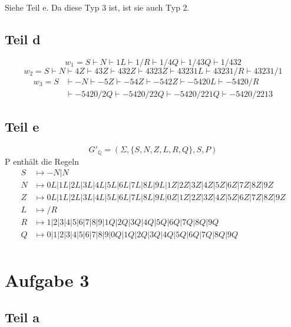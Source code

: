 \documentclass[10pt,a4paper]{article}
\begin{document}
Siehe Teil e.
Da diese Typ 3 ist, ist sie auch Typ 2.

\subsection{Teil d}

\begin{equation}
  w_{1} = S \vdash N \vdash 1L \vdash 1/R \vdash 1/4Q \vdash 1/43Q \vdash 1/432
\end{equation}
\begin{equation}
  w_{2} = S \vdash N \vdash 4Z \vdash 43Z \vdash 432Z \vdash 4323Z \vdash 43231L \vdash 43231/R \vdash 43231/1
\end{equation}
\begin{align*}
  w_{3} = S & \vdash -N \vdash -5Z \vdash -54Z \vdash -542Z \vdash -5420L \vdash -5420/R\\
  & \vdash -5420/2Q \vdash -5420/22Q \vdash -5420/221Q \vdash -5420/2213
\end{align*}

\subsection{Teil e}

\begin{equation}
  G'_{\mathbb{Q}} = (\Sigma, \{ S, N, Z, L, R, Q \}, S, P)
\end{equation}
P enthält die Regeln
\begin{align*}
  S & \mapsto -N | N\\
  N & \mapsto 0L | 1L | 2L | 3L | 4L | 5L | 6L | 7L | 8L | 9L | 1Z | 2Z | 3Z | 4Z | 5Z | 6Z | 7Z | 8Z | 9Z\\
  Z & \mapsto 0L | 1L | 2L | 3L | 4L | 5L | 6L | 7L | 8L | 9L | 0Z | 1Z | 2Z | 3Z | 4Z | 5Z | 6Z | 7Z | 8Z | 9Z\\
  L & \mapsto /R\\
  R & \mapsto 1 | 2 | 3 | 4 | 5 | 6 | 7 | 8 | 9 | 1Q | 2Q | 3Q | 4Q | 5Q | 6Q | 7Q | 8Q | 9Q\\
  Q & \mapsto 0 | 1 | 2 | 3 | 4 | 5 | 6 | 7 | 8 | 9 | 0Q | 1Q | 2Q | 3Q | 4Q | 5Q | 6Q | 7Q | 8Q | 9Q\\
\end{align*}

\section{Aufgabe 3}

\subsection{Teil a}
\end{document}

